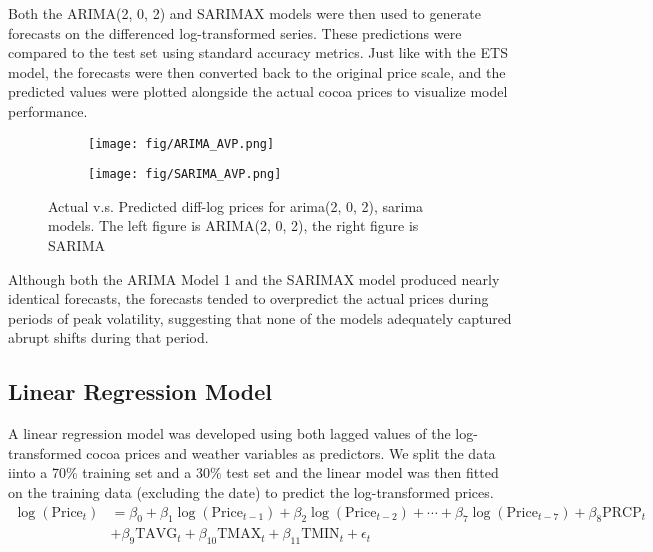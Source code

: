 \documentclass[10pt]{article}
\begin{document}
\noindent
Both the ARIMA(2, 0, 2) and SARIMAX models were then used to generate forecasts on the differenced log-transformed series. These predictions were compared to the test set using standard accuracy metrics. Just like with the ETS model, the forecasts were then converted back to the original price scale, and the predicted values were plotted alongside the actual cocoa prices to visualize model performance.
\begin{figure}[h!]
    \captionsetup{font=scriptsize}
    \centering
    \begin{subfigure}[b]{0.47\textwidth}
        \centering
        \texttt{[image: fig/ARIMA\_AVP.png]}
        \label{fig:m5_c2}
    \end{subfigure}
    \begin{subfigure}[b]{0.47\textwidth}
        \centering
        \texttt{[image: fig/SARIMA\_AVP.png]}
        \label{fig:m5_qq}
    \end{subfigure}
    \caption{Actual v.s. Predicted diff-log prices for arima(2, 0, 2), sarima models. The left figure is ARIMA(2, 0, 2), the right figure is SARIMA}
    \label{fig:res}
\end{figure}
Although both the ARIMA Model 1 and the SARIMAX model produced nearly identical forecasts, the forecasts tended to overpredict the actual prices during periods of peak volatility, suggesting that none of the models adequately captured abrupt shifts during that period.

\vspace{1em}

\subsection{Linear Regression Model}
A linear regression model was developed using both lagged values of the log-transformed cocoa prices and weather variables as predictors. We split the data iinto a 70\% training set and a 30\% test set and the linear model was then fitted on the training data (excluding the date) to predict the log-transformed prices.
\begin{align*}
    \log(\text{Price}_t) &= \beta_0 + \beta_1 \log(\text{Price}_{t-1}) + \beta_2 \log(\text{Price}_{t-2}) + \cdots + \beta_7 \log(\text{Price}_{t-7}) + \beta_8 \text{PRCP}_t \\
    &+ \beta_9 \text{TAVG}_t + \beta_{10} \text{TMAX}_t + \beta_{11} \text{TMIN}_t + \epsilon_t
\end{align*}
\end{document}
